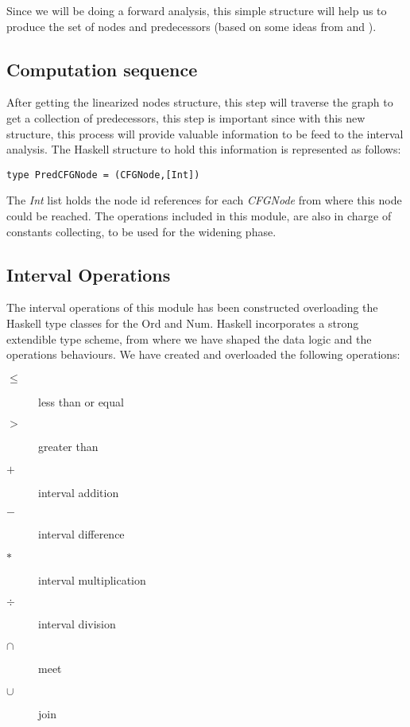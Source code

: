 \documentclass{article}
\begin{document}
Since we will be doing a forward analysis, this simple structure will help us to produce the set of nodes and predecessors (based on some ideas from \cite{Cousot} and \cite{Bourdoncle}). %


\subsection{Computation sequence} 

After getting the linearized nodes structure, this step will traverse the graph to get a collection of predecessors, this step is important since with this new structure, this process will provide valuable information to be feed to the interval analysis. The Haskell structure to hold this information is represented  as follows:

\begin{verbatim}
type PredCFGNode = (CFGNode,[Int])
\end{verbatim}

The \emph{ Int } list holds the node id references for each \emph{ CFGNode } from where this node could be reached. The operations included in this module, are also in charge of constants collecting, to be used for the widening phase.

\subsection{Interval Operations}
The interval operations of this module has been constructed overloading the Haskell type classes for the Ord and Num. Haskell incorporates a strong extendible type scheme, from where we have shaped the data logic and the operations behaviours. We have created and overloaded the following operations:

\begin{description}
  \item[$ \le $] less than or equal
  \item[$ > $] greater than 
  \item[$ + $] interval addition 
  \item[$ - $] interval difference
  \item[$ * $] interval multiplication 
  \item[$ \div $] interval division
  \item[$ \cap $] meet
  \item[$ \cup $] join 
\end{description}
\end{document}
